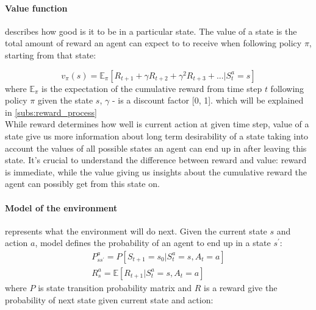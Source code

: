 
\paragraph{Value function} describes how good is it to be in a particular state.
The value of a state is the total amount of reward an agent can expect to
to receive when following policy $\pi$, starting from that state:

\begin{equation} \label{eq:general_value_function}
	v_{\pi}(s) = \mathbb{E}_{\pi} [R_{t+1} + \gamma R_{t+2} + \gamma^2 R_{t+3} + ... | S_t^a = s]
\end{equation}
where $\mathbb{E}_{\pi}$ is the expectation of the cumulative reward from time step $t$
following policy $\pi$ given the state $s$, $\gamma$ - is a discount factor [0, 1].
 which will be explained in \autoref{subs:reward_process}\\
While reward determines how well is current action at given time step, value of a state
give us more information about long term desirability of a state taking into account
the values of all possible states an agent can end up in after leaving this state.
It's crucial to understand the difference between reward and value: reward is immediate,
while the value giving us insights about the cumulative reward the agent can possibly get
from this state on.

\paragraph{Model of the environment} represents what the environment will do next. Given
the current state $s$ and action $a$, model defines the probability of an agent to end up in
a state $s^\prime$:
\begin{align} \label{eq:model_env}
P^a_{ss^{\prime}} = P[S_{t+1} = s_0 | S_t^a = s, A_t = a] \\
R^a_s = \mathbb{E}[R_{t+1} | S_t^a = s, A_t = a]
\end{align}
where $P$ is state transition probability matrix and $R$ is a reward give
	the probability of next state given current state and action:

